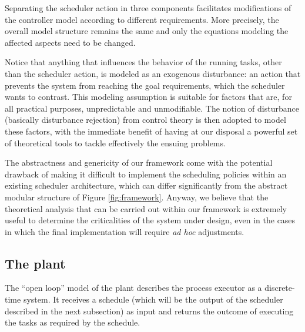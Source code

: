 \documentclass[a4paper]{article}
\begin{document}
Separating the scheduler action in three components facilitates modifications
of the controller model according to different requirements. More precisely,
the overall  model structure remains the same and only the equations modeling 
the affected aspects need to be changed.

Notice that anything that influences the behavior of the running tasks, other
than the scheduler action, is modeled as an exogenous disturbance: an action 
that prevents the system from reaching the goal requirements, which the 
scheduler wants to contrast. This modeling assumption is suitable for factors 
that are, for all practical purposes, unpredictable and unmodifiable.
The notion of disturbance (basically disturbance rejection) from control 
theory is then adopted to model these factors, with the immediate benefit of 
having at our disposal a powerful set of theoretical tools to tackle 
effectively the ensuing problems.

The abstractness and genericity of our framework come with the potential 
drawback of making it difficult to implement the scheduling policies within an 
existing scheduler architecture, which can differ significantly from the 
abstract modular structure of Figure \ref{fig:framework}.
Anyway, we believe that the theoretical analysis that can be carried out
within our framework is extremely useful to determine the criticalities of 
the system under design, even in the cases in which the final implementation 
will require \emph{ad hoc} adjustments.


\subsection{The plant}
\label{sec:plant}
The ``open loop'' model of the plant describes the process executor as a 
discrete-time system. It receives a schedule (which will be the output of the
scheduler described in the next subsection) as input and returns the outcome
of executing the tasks as required by the schedule.
\end{document}
